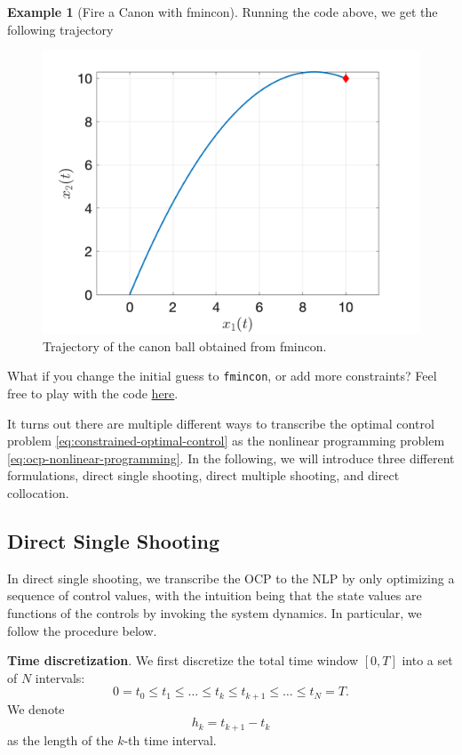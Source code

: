 \documentclass[
]{book}
\theoremstyle{definition}
\theoremstyle{definition}
\newtheorem{example}{Example}[chapter]
\theoremstyle{definition}
\theoremstyle{definition}
\theoremstyle{remark}
\begin{document}
\begin{example}[Fire a Canon with fmincon]
Running the code above, we get the following trajectory

\begin{figure}

{\centering \includegraphics[width=0.7\linewidth]{images/canon_ball} 

}

\caption{Trajectory of the canon ball obtained from fmincon.}\label{fig:fire-canon-ball}
\end{figure}

What if you change the initial guess to \texttt{fmincon}, or add more constraints? Feel free to play with the code \href{https://github.com/ComputationalRobotics/OptimalControlEstimation-Examples/blob/main/fire_canon_ball_fmincon.m}{here}.
\end{example}

It turns out there are multiple different ways to transcribe the optimal control problem \eqref{eq:constrained-optimal-control} as the nonlinear programming problem \eqref{eq:ocp-nonlinear-programming}. In the following, we will introduce three different formulations, direct single shooting, direct multiple shooting, and direct collocation.

\hypertarget{direct-single-shooting}{%
\subsection{Direct Single Shooting}\label{direct-single-shooting}}

In direct single shooting, we transcribe the OCP to the NLP by only optimizing a sequence of control values, with the intuition being that the state values are functions of the controls by invoking the system dynamics. In particular, we follow the procedure below.

\textbf{Time discretization}. We first discretize the total time window \([0,T]\) into a set of \(N\) intervals:
\[
0 = t_0 \leq t_1 \leq \dots \leq t_k \leq t_{k+1} \leq \dots \leq t_N = T.
\]
We denote
\[
h_k = t_{k+1} - t_k
\]
as the length of the \(k\)-th time interval.
\end{document}
